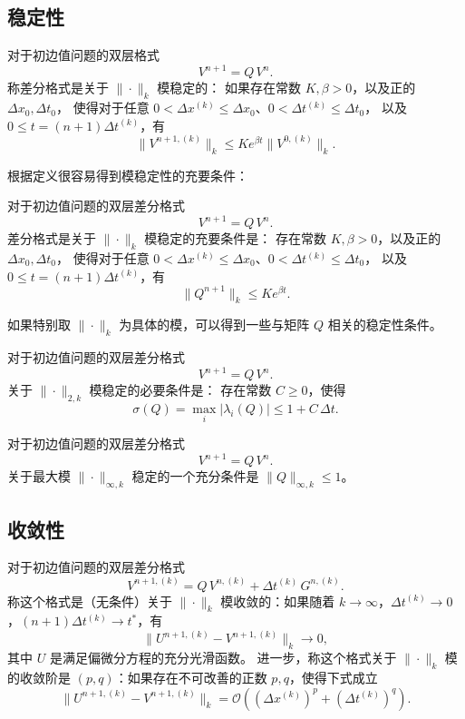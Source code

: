 \subsection{稳定性}

\begin{definition}[模稳定性]
    对于初边值问题的双层格式
    \[
        V^{n+1} = Q \, V^{n}.
    \]
    称差分格式是关于 $\|\cdot\|_k$ 模稳定的：
    如果存在常数 $K,\beta > 0$，以及正的 $\Delta x_0,\Delta t_0$，
    使得对于任意 $0 < \Delta x^{(k)} \le \Delta x_0$、$0 < \Delta t^{(k)} \le \Delta t_0$，
    以及 $0 \le t = (n+1)\Delta t^{(k)}$，有
    \[
        \|V^{n+1,(k)}\|_{k} \le K e^{\beta t} \| V^{0,(k)}\|_k.
    \]
\end{definition}

根据定义很容易得到模稳定性的充要条件：
\begin{theorem}
    对于初边值问题的双层差分格式
    \[
        V^{n+1} = Q \, V^{n}.
    \]
    差分格式是关于 $\|\cdot\|_k$ 模稳定的充要条件是：
    存在常数 $K,\beta > 0$，以及正的 $\Delta x_0,\Delta t_0$，
    使得对于任意 $0 < \Delta x^{(k)} \le \Delta x_0$、$0 < \Delta t^{(k)} \le \Delta t_0$，
    以及 $0 \le t = (n+1)\Delta t^{(k)}$，有
    \[
        \|Q^{n+1}\|_{k} \le K e^{\beta t}.
    \]
\end{theorem}

如果特别取 $\|\cdot\|_k$ 为具体的模，可以得到一些与矩阵 $Q$ 相关的稳定性条件。

\begin{theorem}
    对于初边值问题的双层差分格式
    \[
        V^{n+1} = Q \, V^{n}.
    \]
    关于 $\|\cdot\|_{2,k}$ 模稳定的必要条件是：
    存在常数 $C \ge 0$，使得
    \[
        \sigma(Q) = \max_i|\lambda_i(Q)| \le 1 + C\,\Delta t.
    \]
\end{theorem}

\begin{theorem}
    对于初边值问题的双层差分格式
    \[
        V^{n+1} = Q \, V^{n}.
    \]
    关于最大模 $\|\cdot\|_{\infty,k}$ 稳定的一个充分条件是 $\|Q\|_{\infty,k} \le 1$。
\end{theorem}

\subsection{收敛性}


\begin{definition}[模收敛性]
    对于初边值问题的双层差分格式
    \[
        V^{n+1,(k)} = Q \, V^{n,(k)} + \Delta t^{(k)}\, G^{n,(k)}.
    \]
    称这个格式是（无条件）关于 $\|\cdot\|_k$ 模收敛的：如果随着 $k \to \infty$，$\Delta t^{(k)} \to 0$，$(n+1) \Delta t^{(k)} \to t^*$，有
    \[
        \|U^{n+1,(k)} - V^{n+1,(k)}\|_{k} \to 0,
    \]
    其中 $U$ 是满足偏微分方程的充分光滑函数。
    进一步，称这个格式关于 $\|\cdot\|_k$ 模的收敛阶是 $(p,q)$：如果存在不可改善的正数 $p,q$，使得下式成立
    \[
        \|U^{n+1,(k)} - V^{n+1,(k)}\|_{k} = \mathcal{O}((\Delta x^{(k)})^p + (\Delta t^{(k)})^q).
    \]
\end{definition}


